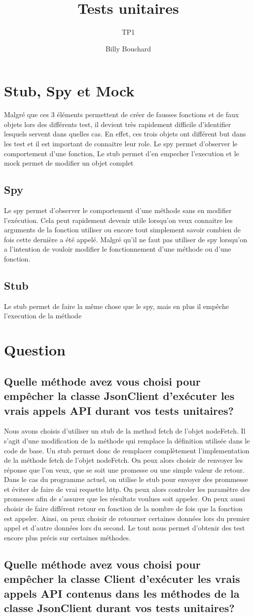 \documentclass{article}
\title{Tests unitaires}
\subtitle{TP1}
\author{Billy Bouchard}{Jacob Dorais}{}
\begin{document}
\maketitle
\section*{Stub, Spy et Mock}
Malgré que ces 3 éléments permettent de créer de fausses fonctions et de faux objets lors des différents test, il devient très rapidement difficile d'identifier lesquels servent dans quelles cas.
En effet, ces trois objets ont différent but dans les test et il est important de connaitre leur role.
Le spy permet d'observer le comportement d'une fonction,
Le stub permet d'en empecher l'execution et le mock permet de modifier un objet complet
\subsection*{Spy}
Le spy permet d'observer le comportement d'une méthode sans en modifier l'exécution.
Cela peut rapidement devenir utile lorsqu'on veux connaitre les arguments de la fonction utiliser ou encore tout simplement savoir combien de fois cette dernière a été appelé.
Malgré qu'il ne faut pas utiliser de spy lorsqu'on a l'intention de vouloir modifier le fonctionnement d'une méthode ou d'une fonction.
\subsection*{Stub}
Le stub permet de faire la même chose que le spy, mais en plus il empêche l'execution de la méthode

\section*{Question}
\subsection*{Quelle méthode avez vous choisi pour empêcher la classe JsonClient d’exécuter
  les vrais appels API durant vos tests unitaires?}
Nous avons choisis d'utiliser un stub de la method fetch de l'objet nodeFetch.
Il s'agit d'une modification de la méthode qui remplace la définition utilisée dans le code de base.
Un stub permet donc de remplacer complètement l'implementation de la méthode fetch de l'objet nodeFetch.
On peux alors choisir de renvoyer les réponse que l'on veux, que se soit une promesse ou une simple valeur de retour.
Dans le cas du programme actuel, on utilise le stub pour envoyer des prommesse et éviter de faire de vrai requette http.
On peux alors controler les paramètre des promesses afin de s'assurer que les résultats voulues soit appeler.
On peux aussi choisir de faire différent retour en fonction de la nombre de fois que la fonction est appeler.
Ainsi, on peux choisir de retourner certaines données lors du premier appel et d'autre données lors du second.
Le tout nous permet d'obtenir des test encore plus précis sur certaines méthodes.
\subsection*{Quelle méthode avez vous choisi pour empêcher la classe Client d’exécuter les
  vrais appels API contenus dans les méthodes de la classe JsonClient durant
  vos tests unitaires?}
\end{document}
